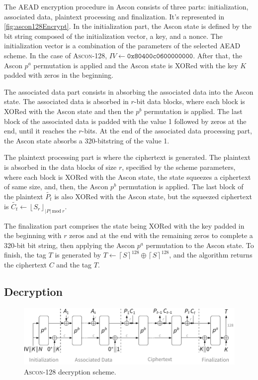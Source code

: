 \documentclass[11pt,twoside]{article}
\begin{document}
The AEAD encryption procedure in Ascon consists of three parts: initialization, associated data, plaintext processing and finalization. It's represented in \cref{fig:ascon128Encrypt}. In the initialization part, the Ascon state is defined by the bit string composed of the initialization vector, a key, and a nonce. The initialization vector is a combination of the parameters of the selected AEAD scheme. In the case of \textsc{Ascon-128}, $IV \leftarrow \texttt{0x80400c0600000000} $. After that, the Ascon $p^a$  permutation is applied and the Ascon state is XORed with the key $K$ padded with zeros in the beginning.

The associated data part consists in absorbing the associated data into the Ascon state. The associated data is absorbed in $r$-bit data blocks, where each block is XORed with the Ascon state and then the $p^b$ permutation is applied. The last block of the associated data is padded with the value 1 followed by zeros at the end, until it reaches the $r$-bits. At the end of the associated data processing part, the Ascon state absorbs a 320-bitstring of the value 1.

The plaintext processing part is where the ciphertext is generated. The plaintext is absorbed in the data blocks of size $r$, specified by the scheme parameters, where each block is XORed with the Ascon state, the state squeezes a ciphertext of same size, and, then, the Ascon $p^b$ permutation is applied. The last block of the plaintext $\tilde{P_t}$ is also XORed with the Ascon
state, but the squeezed ciphertext is $\tilde{C_t} \leftarrow {\left \lfloor  S_r \right \rfloor}_{|P| \ \textrm{mod} \ r}$.

The finalization part comprises the state being XORed with the key padded in the beginning with $r$ zeros and at the end with the remaining zeros to complete a 320-bit bit string, then applying the Ascon $p^a$ permutation to the Ascon state. To finish, the tag $T$ is generated by $T \leftarrow {\left \lceil  S \right \rceil}^{128} \oplus  {\left \lceil  S \right \rceil}^{128}$, and the algorithm returns the ciphertext $C$ and the tag $T$.

\subsection{Decryption}

\begin{figure}[h]
  \centering
  \includegraphics[scale=0.8]{assets/aead_decrypt.pdf}
  \caption{\textsc{Ascon-128} decryption scheme.}
  \label{fig:ascon128decrypt}
\end{figure}
\end{document}
